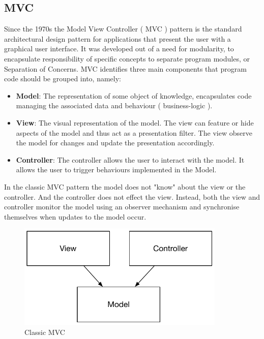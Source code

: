 \subsection{MVC}
Since the 1970s the Model View Controller ( MVC ) pattern is the standard architectural design pattern for applications that present the user with a graphical user interface. It was developed out of a need for modularity, to encapsulate responsibility of specific concepts to separate program modules, or Separation of Concerns. MVC identifies three main components that program code should be grouped into, namely\cite{walther_2016}:

\begin{itemize}[label={}]

\item \textbf{Model}: The representation of some object of knowledge, encapsulates code managing the associated data and behaviour ( business-logic ).
\item \textbf{View}: The visual representation of the model. The view can feature or hide aspects of the model and thus act as a presentation filter. The view observe the model for changes and update the presentation accordingly.
\item \textbf{Controller}: The controller allows the user to interact with the model. It allows the user to trigger behaviours implemented in the Model.

\end{itemize}

In the classic MVC pattern the model does not "know" about the view or the controller. And the controller does not effect the view. Instead, both the view and controller monitor the model using an observer mechanism and synchronise themselves when updates to the model occur.

\begin{figure}[H]
    \centering
    \includegraphics[height=5cm,keepaspectratio]{assets/concept/mvc_1.pdf}
    \caption{Classic MVC}
    \label{fig:mvc_1}
\end{figure}

